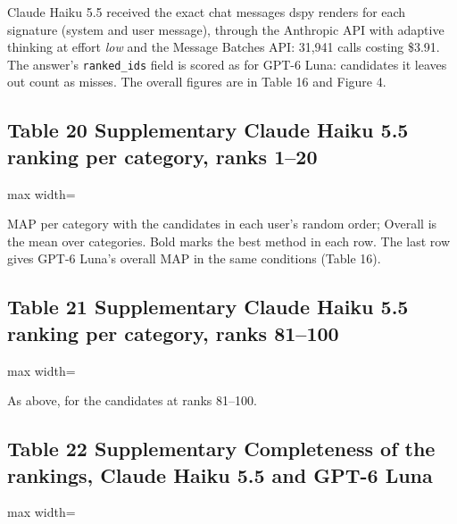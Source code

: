 \documentclass[10pt]{article}
\begin{document}
Claude Haiku 5.5 received the exact chat messages dspy renders for each signature (system and user message), through the Anthropic API with adaptive thinking at effort \emph{low} and the Message Batches API: 31,941 calls costing \$3.91. The answer's \texttt{ranked\_ids} field is scored as for GPT-6 Luna: candidates it leaves out count as misses. The overall figures are in Table 16 and Figure 4.

\subsection*{Table 20 \textperiodcentered{} Supplementary \textperiodcentered{} Claude Haiku 5.5 ranking per category, ranks 1--20}
\begin{center}\begin{adjustbox}{max width=\linewidth}

\end{adjustbox}\end{center}

{\small MAP per category with the candidates in each user's random order; Overall is the mean over categories. Bold marks the best method in each row. The last row gives GPT-6 Luna's overall MAP in the same conditions (Table 16).}

\subsection*{Table 21 \textperiodcentered{} Supplementary \textperiodcentered{} Claude Haiku 5.5 ranking per category, ranks 81--100}
\begin{center}\begin{adjustbox}{max width=\linewidth}

\end{adjustbox}\end{center}

{\small As above, for the candidates at ranks 81--100.}

\subsection*{Table 22 \textperiodcentered{} Supplementary \textperiodcentered{} Completeness of the rankings, Claude Haiku 5.5 and GPT-6 Luna}
\begin{center}\begin{adjustbox}{max width=\linewidth}

\end{adjustbox}\end{center}
\end{document}

